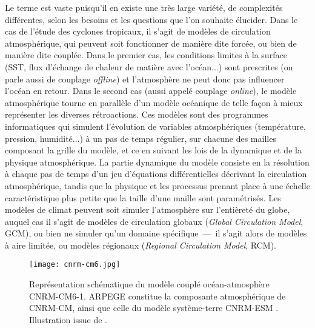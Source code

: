 \documentclass[../main.tex]{subfiles}
\begin{document}
Le terme  est vaste puisqu'il en existe une très large variété, de complexités différentes, selon les besoins et les questions que
l'on souhaite élucider. Dans le cas de l'étude des cyclones tropicaux, il s'agit de modèles de circulation atmosphérique, qui peuvent soit fonctionner de
manière dite forcée, ou bien de manière dite couplée. Dans le premier cas, les conditions limites à la surface (SST, flux d'échange de chaleur de matière avec
l'océan...) sont prescrites (on parle aussi de couplage \textit{offline}) et l'atmosphère ne peut donc pas influencer l'océan en retour. Dans le second cas
(aussi appelé couplage \textit{online}), le modèle atmosphérique tourne en parallèle d'un modèle océanique de telle façon à mieux représenter les diverses
rétroactions. Ces modèles sont des programmes informatiques qui simulent l'évolution de variables atmosphériques (température, pression, humidité...) à un pas
de temps régulier, sur chacune des mailles composant la grille du modèle, et ce en suivant les lois de la dynamique et de la physique atmosphérique. La partie
dynamique du modèle consiste en la résolution à chaque pas de temps d'un jeu d'équations différentielles décrivant la circulation atmosphérique, tandis que la
physique et les processus prenant place à une échelle caractéristique plus petite que la taille d'une maille sont paramétrisés. Les modèles de climat peuvent
soit simuler l'atmosphère sur l'entièreté du globe, auquel cas il s'agit de modèles de circulation globaux (\textit{Global Circulation Model}, GCM), ou bien ne
simuler qu'un domaine spécifique~---~il s'agit alors de modèles à aire limitée, ou modèles régionaux (\textit{Regional Circulation Model}, RCM).

\begin{figure}[t]
    \centering
    \texttt{[image: cnrm-cm6.jpg]}
    \caption{Représentation schématique du modèle couplé océan-atmosphère CNRM-CM6-1. \hbox{ARPEGE} constitue la composante atmosphérique de CNRM-CM, ainsi que
    celle du modèle système-terre CNRM-ESM \parencite{seferian_evaluation_2019}. Illustration issue de \cite{voldoire_evaluation_2019}.}
    \label{fig:cnrm-cm6}
\end{figure}
\end{document}
